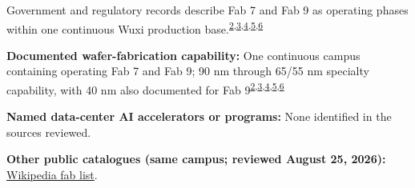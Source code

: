 \begin{minipage}[t][0.90\textheight][t]{\textwidth}
\begin{minipage}[t]{\textwidth}
\begin{minipage}[t]{0.32\textwidth}
\medskip
{\footnotesize Government and regulatory records describe Fab 7 and Fab 9 as operating phases within one continuous Wuxi production base.\nobreak\textsuperscript{\href{\detokenize{https://www1.hkexnews.hk/listedco/listconews/sehk/2025/0408/2025040800831.pdf}}{\textcolor{accent}{2}},\href{\detokenize{https://www.wnd.gov.cn/doc/2024/08/26/4380012.shtml}}{\textcolor{accent}{3}},\href{\detokenize{https://www1.hkexnews.hk/listedco/listconews/sehk/2026/0813/2026081300401.pdf}}{\textcolor{accent}{4}},\href{\detokenize{https://www1.hkexnews.hk/listedco/listconews/sehk/2026/0409/2026040901618_c.pdf}}{\textcolor{accent}{5}},\href{\detokenize{https://www1.hkexnews.hk/listedco/listconews/sehk/2023/0224/2023022400027.pdf}}{\textcolor{accent}{6}}}\par}
\medskip
{\footnotesize\textbf{Documented wafer-fabrication capability:} One continuous campus containing operating Fab 7 and Fab 9; 90 nm through 65/55 nm specialty capability, with 40 nm also documented for Fab 9\nobreak\textsuperscript{\href{\detokenize{https://www1.hkexnews.hk/listedco/listconews/sehk/2025/0408/2025040800831.pdf}}{\textcolor{accent}{2}},\href{\detokenize{https://www.wnd.gov.cn/doc/2024/08/26/4380012.shtml}}{\textcolor{accent}{3}},\href{\detokenize{https://www1.hkexnews.hk/listedco/listconews/sehk/2026/0813/2026081300401.pdf}}{\textcolor{accent}{4}},\href{\detokenize{https://www1.hkexnews.hk/listedco/listconews/sehk/2026/0409/2026040901618_c.pdf}}{\textcolor{accent}{5}},\href{\detokenize{https://www1.hkexnews.hk/listedco/listconews/sehk/2023/0224/2023022400027.pdf}}{\textcolor{accent}{6}}}\par}
\end{minipage}
\end{minipage}
\par\vspace{0.65em}
\medskip
{\footnotesize\textbf{Named data-center AI accelerators or programs:} None identified in the sources reviewed.\par}
\smallskip
{\sffamily\scriptsize\color{black!62}\textbf{Other public catalogues (same campus; reviewed August 25, 2026):} \href{\detokenize{https://en.wikipedia.org/w/index.php?title=List_of_semiconductor_fabrication_plants&oldid=1370451124}\#\detokenize{Open_plants}}{Wikipedia fab list}.\par}
\medskip

\end{minipage}

